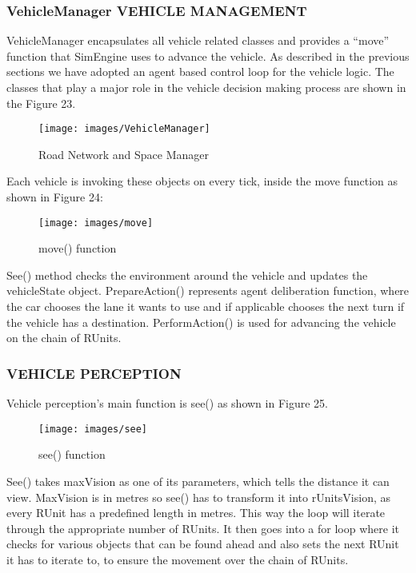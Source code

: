 \documentclass[11pt,a4paper]{article}
\begin{document}
  \subsubsection{VehicleManager VEHICLE MANAGEMENT}
  
  VehicleManager encapsulates all vehicle related classes and provides a “move” function that SimEngine uses to advance the vehicle.
As described in the previous sections we have adopted an agent based control loop for the vehicle logic. The classes that play a major role in the vehicle decision making process are shown in the Figure 23. 
  \begin{figure}[h!]
			\texttt{[image: images/VehicleManager]}
			\caption{Road Network and Space Manager}
			\centering
		\end{figure} 
  Each vehicle is invoking these objects on every tick, inside the move function as shown in Figure 24:
  
   \begin{figure}[h!]
			\texttt{[image: images/move]}
			\caption{move() function}
			\centering
		\end{figure} 
	See() method checks the environment around the vehicle and updates the vehicleState object. PrepareAction() represents agent deliberation function, where the car chooses the lane it wants to use and if applicable chooses the next turn if the vehicle has a destination. PerformAction() is used for advancing the vehicle on the chain of RUnits.
  
  \subsubsection{VEHICLE PERCEPTION}
  
  Vehicle perception’s main function is see() as shown in Figure 25.
   \begin{figure}[h!]
			\texttt{[image: images/see]}
			\caption{see() function}
			\centering
		\end{figure} 
See() takes maxVision as one of its parameters, which tells the distance it can view. MaxVision is in metres so see() has to transform it into rUnitsVision, as every RUnit has a predefined length in metres. This way the loop will iterate through the appropriate number of RUnits.
It then goes into a for loop where it checks for various objects that can be found ahead and also sets the next RUnit it has to iterate to, to ensure the movement over the chain of RUnits.
\end{document}
